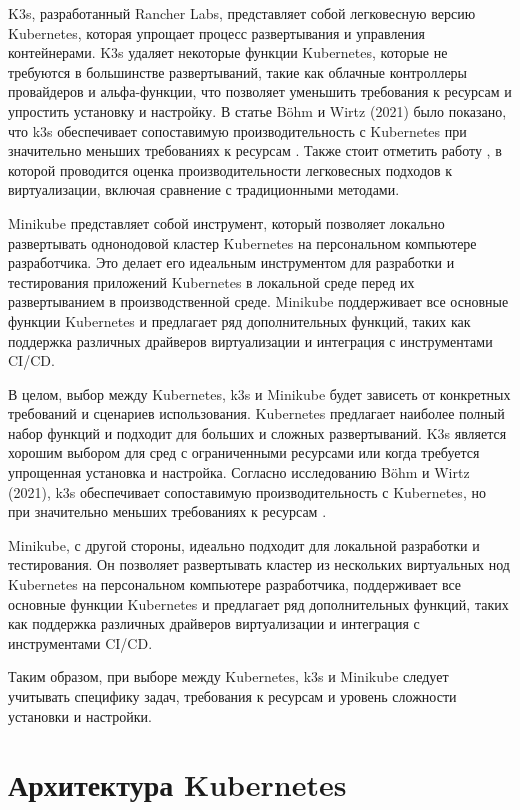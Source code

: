 K3s, разработанный Rancher Labs, представляет собой легковесную версию
Kubernetes, которая упрощает процесс развертывания и управления
контейнерами. K3s удаляет некоторые функции Kubernetes, которые
не требуются в большинстве развертываний, такие как облачные
контроллеры провайдеров и альфа-функции, что позволяет уменьшить
требования к ресурсам и упростить установку и настройку. В статье
Böhm и Wirtz (2021) было показано, что k3s обеспечивает
сопоставимую производительность с Kubernetes при значительно
меньших требованиях к ресурсам \cite{bohm2021profiling}. Также стоит отметить работу
\cite{plauth2017performance}, в которой проводится оценка производительности легковесных подходов
к виртуализации, включая сравнение с традиционными методами.

Minikube представляет собой инструмент, который позволяет локально
развертывать однонодовой кластер Kubernetes на персональном компьютере
разработчика. Это делает его идеальным инструментом для разработки и 
тестирования приложений Kubernetes в локальной среде перед их
развертыванием в производственной среде. Minikube поддерживает все
основные функции Kubernetes и предлагает ряд дополнительных функций,
таких как поддержка различных драйверов виртуализации и интеграция с
инструментами CI/CD.

В целом, выбор между Kubernetes, k3s и Minikube будет зависеть от
конкретных требований и сценариев использования. Kubernetes предлагает
наиболее полный набор функций и подходит для больших и сложных
развертываний. K3s является хорошим выбором для сред с
ограниченными ресурсами или когда требуется упрощенная установка и
настройка. Согласно исследованию Böhm и Wirtz (2021), k3s обеспечивает
сопоставимую производительность с Kubernetes, но при значительно меньших
требованиях к ресурсам \cite{bohm2021profiling}.

Minikube, с другой стороны, идеально подходит для локальной
разработки и тестирования. Он позволяет развертывать кластер из нескольких
виртуальных нод Kubernetes на персональном компьютере разработчика,
поддерживает все основные функции Kubernetes и предлагает ряд
дополнительных функций, таких как поддержка различных драйверов
виртуализации и интеграция с инструментами CI/CD.

Таким образом, при выборе между Kubernetes, k3s и
Minikube следует учитывать специфику задач, требования
к ресурсам и уровень сложности установки и настройки.


\section{Архитектура Kubernetes}

